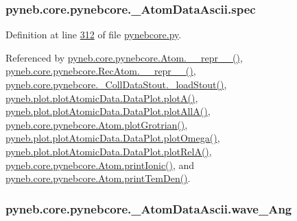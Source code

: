 \hypertarget{classpyneb_1_1core_1_1pynebcore_1_1___atom_data_ascii_a6a8de35e7e1695c3dd670b46c776f45e}{
\subsubsection[{spec}]{\setlength{\rightskip}{0pt plus 5cm}pyneb.\-core.\-pynebcore.\-\_\-\-Atom\-Data\-Ascii.\-spec}}\label{classpyneb_1_1core_1_1pynebcore_1_1___atom_data_ascii_a6a8de35e7e1695c3dd670b46c776f45e}


Definition at line \hyperlink{pynebcore_8py_source_l00312}{312} of file \hyperlink{pynebcore_8py_source}{pynebcore.\-py}.



Referenced by \hyperlink{pynebcore_8py_source_l02615}{pyneb.\-core.\-pynebcore.\-Atom.\-\_\-\-\_\-repr\-\_\-\-\_\-()}, \hyperlink{pynebcore_8py_source_l03154}{pyneb.\-core.\-pynebcore.\-Rec\-Atom.\-\_\-\-\_\-repr\-\_\-\-\_\-()}, \hyperlink{pynebcore_8py_source_l01178}{pyneb.\-core.\-pynebcore.\-\_\-\-Coll\-Data\-Stout.\-\_\-load\-Stout()}, \hyperlink{plot_atomic_data_8py_source_l00117}{pyneb.\-plot.\-plot\-Atomic\-Data.\-Data\-Plot.\-plot\-A()}, \hyperlink{plot_atomic_data_8py_source_l00189}{pyneb.\-plot.\-plot\-Atomic\-Data.\-Data\-Plot.\-plot\-All\-A()}, \hyperlink{pynebcore_8py_source_l02443}{pyneb.\-core.\-pynebcore.\-Atom.\-plot\-Grotrian()}, \hyperlink{plot_atomic_data_8py_source_l00373}{pyneb.\-plot.\-plot\-Atomic\-Data.\-Data\-Plot.\-plot\-Omega()}, \hyperlink{plot_atomic_data_8py_source_l00262}{pyneb.\-plot.\-plot\-Atomic\-Data.\-Data\-Plot.\-plot\-Rel\-A()}, \hyperlink{pynebcore_8py_source_l02233}{pyneb.\-core.\-pynebcore.\-Atom.\-print\-Ionic()}, and \hyperlink{pynebcore_8py_source_l02324}{pyneb.\-core.\-pynebcore.\-Atom.\-print\-Tem\-Den()}.

\hypertarget{classpyneb_1_1core_1_1pynebcore_1_1___atom_data_ascii_a1366f737e51b5a0f3706b68b0d06bfe5}{
\subsubsection[{wave\-\_\-\-Ang}]{\setlength{\rightskip}{0pt plus 5cm}pyneb.\-core.\-pynebcore.\-\_\-\-Atom\-Data\-Ascii.\-wave\-\_\-\-Ang}}\label{classpyneb_1_1core_1_1pynebcore_1_1___atom_data_ascii_a1366f737e51b5a0f3706b68b0d06bfe5}


